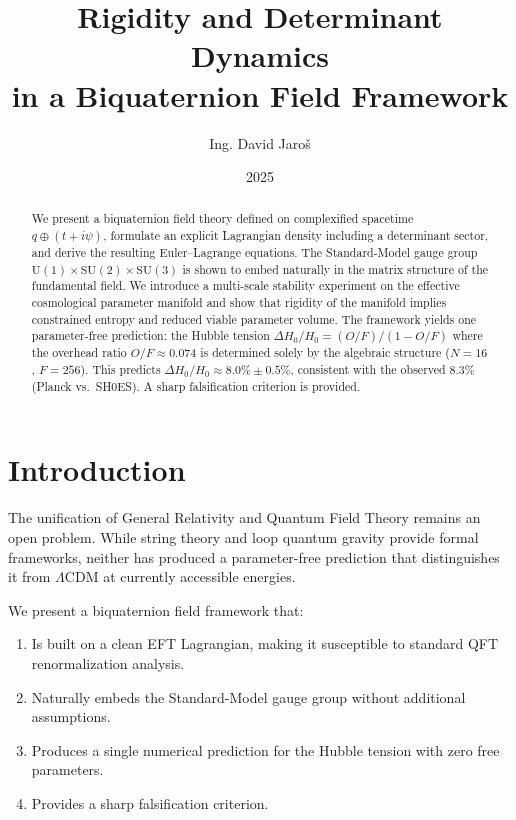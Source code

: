 \documentclass[12pt,a4paper]{article}
\title{Rigidity and Determinant Dynamics\\
       in a Biquaternion Field Framework}
\author{Ing. David Jaroš}
\date{2025}
\begin{document}
\maketitle

\begin{abstract}
We present a biquaternion field theory defined on complexified spacetime
$q \oplus (t+i\psi)$, formulate an explicit Lagrangian density including a
determinant sector, and derive the resulting Euler--Lagrange equations.
The Standard-Model gauge group $\mathrm{U}(1)\times\mathrm{SU}(2)\times\mathrm{SU}(3)$
is shown to embed naturally in the matrix structure of the fundamental field.
We introduce a multi-scale stability experiment on the effective cosmological
parameter manifold and show that rigidity of the manifold implies constrained
entropy and reduced viable parameter volume.
The framework yields one parameter-free prediction: the Hubble tension
$\Delta H_0/H_0 = (O/F)/(1-O/F)$ where the overhead ratio $O/F\approx 0.074$
is determined solely by the algebraic structure ($N=16$, $F=256$).
This predicts $\Delta H_0/H_0 \approx 8.0\%\pm 0.5\%$, consistent with
the observed $8.3\%$ (Planck vs.\ SH0ES).
A sharp falsification criterion is provided.
\end{abstract}

\tableofcontents
\newpage

\section{Introduction}

The unification of General Relativity and Quantum Field Theory remains an open
problem.
While string theory and loop quantum gravity provide formal frameworks, neither
has produced a parameter-free prediction that distinguishes it from
$\Lambda$CDM at currently accessible energies.

We present a biquaternion field framework that:
\begin{enumerate}
  \item Is built on a clean EFT Lagrangian, making it susceptible to standard QFT
        renormalization analysis.
  \item Naturally embeds the Standard-Model gauge group without additional assumptions.
  \item Produces a single numerical prediction for the Hubble tension with zero
        free parameters.
  \item Provides a sharp falsification criterion.
\end{enumerate}
\end{document}
